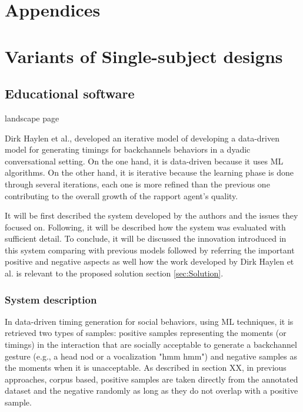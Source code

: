 \section*{Appendices}
\section{Variants of Single-subject designs}
\label{app:SSD}

\newpage
\begin{landscape}
	\section{Educational software}
	\label{app:Educational}	
	landscape page
\end{landscape}













Dirk Haylen et al., developed an iterative model of developing a data-driven model for generating timings for backchannels behaviors in a dyadic conversational setting. On the one hand, it is data-driven because it uses \ac{ML} algorithms. On the other hand, it is iterative because the learning phase is done through several iterations, each one is more refined than the previous one contributing to the overall growth of the rapport agent's quality.

It will be first described the system developed by the authors and the issues they focused on. Following, it will be described how the system was evaluated with sufficient detail. To conclude, it will be discussed the innovation introduced in this system comparing with previous models followed by referring the important positive and negative aspects as well how the work developed by Dirk Haylen et al. is relevant to the proposed solution section \ref{sec:Solution}.

\subsubsection*{System description}
In data-driven timing generation for social behaviors, using \ac{ML} techniques, it is retrieved two types of samples: positive samples representing the moments (or timings) in the interaction that are socially acceptable to generate a backchannel gesture (e.g., a head nod or a vocalization "hmm hmm") and negative samples as the moments when it is unacceptable. As described in section XX, in previous approaches, corpus based, positive samples are taken directly from the annotated dataset and the negative randomly as long as they do not overlap with a positive sample. 

